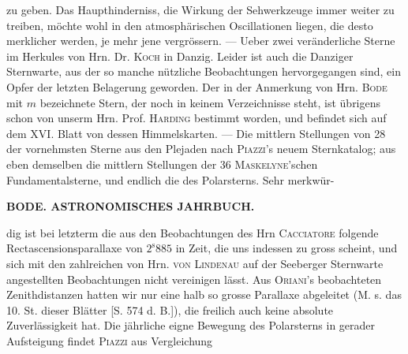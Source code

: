 zu geben. Das Haupthinderniss, die Wirkung der Sehwerkzeuge immer weiter zu treiben, möchte wohl
in den atmosphärischen Oscillationen liegen, die desto merklicher werden, je mehr jene vergrössern. ---
Ueber zwei veränderliche Sterne im Herkules von Hrn. Dr. \textsc{Koch} in Danzig. Leider ist auch die Danziger Sternwarte, aus der so manche nützliche Beobachtungen hervorgegangen sind, ein Opfer der letzten Belagerung geworden. Der in der Anmerkung von Hrn. \textsc{Bode} mit $m$ bezeichnete Stern, der noch
in keinem Verzeichnisse steht, ist übrigens schon von unserm Hrn. Prof. \textsc{Harding} bestimmt worden, und
befindet sich auf dem XVI. Blatt von dessen Himmelskarten. --- Die mittlern Stellungen von 28 der
vornehmsten Sterne aus den Plejaden nach \textsc{Piazzi}'s neuem Sternkatalog; aus eben demselben die mittlern
Stellungen der 36 \textsc{Maskelyne}'schen Fundamentalsterne, und endlich die des Polarsterns. Sehr merkwür-
\par
\clearpage
\thispagestyle{empty}
\noindent{}%
\makebox[12mm][l]{}%
\parbox[t]{\dimexpr\linewidth-24mm\relax}{\centering\footnotesize\bfseries BODE. ASTRONOMISCHES JAHRBUCH.}%
\par\nobreak\medskip
\noindent dig ist bei letzterm die aus den Beobachtungen des Hrn \textsc{Cacciatore} folgende Rectascensionsparallaxe von
$2^{\mathrm{s}}885$ in Zeit, die uns indessen zu gross scheint, und sich mit den zahlreichen von Hrn. \textsc{von Lindenau}
auf der Seeberger Sternwarte angestellten Beobachtungen nicht vereinigen lässt. Aus \textsc{Oriani}'s beobachteten
Zenithdistanzen hatten wir nur eine halb so grosse Parallaxe abgeleitet (M. s. das 10. St. dieser Blätter
[S. 574 d. B.]), die freilich auch keine absolute Zuverlässigkeit hat. Die jährliche eigne Bewegung des
Polarsterns in gerader Aufsteigung findet \textsc{Piazzi} aus Vergleichung

